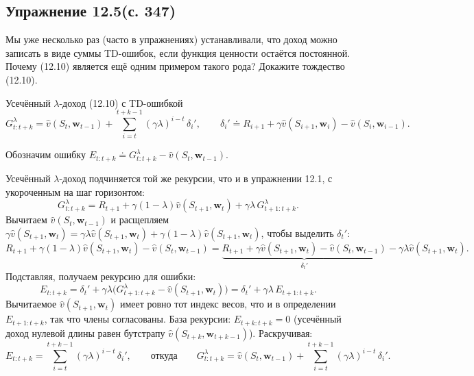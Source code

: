 \subsection{Упражнение 12.5(с. 347)}
Мы уже несколько раз (часто в упражнениях) устанавливали, что доход можно
записать в виде суммы TD-ошибок, если функция ценности остаётся постоянной.
Почему (12.10) является ещё одним примером такого рода? Докажите тождество
(12.10).

Усечённый $\lambda$-доход (12.10) с TD-ошибкой
\begin{equation}
    G_{t:t+k}^\lambda = \hat v(S_t,\mathbf w_{t-1})
    + \sum_{i=t}^{t+k-1} (\gamma\lambda)^{i-t}\,\delta_i',
    \qquad
    \delta_i' \doteq R_{i+1} + \gamma\hat v(S_{i+1},\mathbf w_i) - \hat v(S_i,\mathbf w_{i-1}).
    \tag{12.10}
\end{equation}

\begin{solution}
    Обозначим ошибку $E_{t:t+k}\doteq G_{t:t+k}^\lambda - \hat v(S_t,\mathbf w_{t-1})$.

    Усечённый $\lambda$-доход подчиняется той же рекурсии, что и в упражнении 12.1,
    с укороченным на шаг горизонтом:
    \begin{equation*}
        G_{t:t+k}^\lambda = R_{t+1} + \gamma(1-\lambda)\hat v(S_{t+1},\mathbf w_t)
        + \gamma\lambda\,G_{t+1:t+k}^\lambda.
    \end{equation*}
    Вычитаем $\hat v(S_t,\mathbf w_{t-1})$ и расщепляем $\gamma\hat v(S_{t+1},\mathbf w_t)
    = \gamma\lambda\hat v(S_{t+1},\mathbf w_t) + \gamma(1-\lambda)\hat v(S_{t+1},\mathbf w_t)$,
    чтобы выделить $\delta_t'$:
    \begin{equation*}
        R_{t+1} + \gamma(1-\lambda)\hat v(S_{t+1},\mathbf w_t) - \hat v(S_t,\mathbf w_{t-1})
        = \underbrace{R_{t+1} + \gamma\hat v(S_{t+1},\mathbf w_t) - \hat v(S_t,\mathbf w_{t-1})}_{\delta_t'}
          - \gamma\lambda\hat v(S_{t+1},\mathbf w_t).
    \end{equation*}
    Подставляя, получаем рекурсию для ошибки:
    \begin{equation*}
        E_{t:t+k} = \delta_t' + \gamma\lambda\big(G_{t+1:t+k}^\lambda - \hat v(S_{t+1},\mathbf w_t)\big)
        = \delta_t' + \gamma\lambda\,E_{t+1:t+k}.
    \end{equation*}
    Вычитаемое $\hat v(S_{t+1},\mathbf w_t)$ имеет ровно тот индекс весов, что и в
    определении $E_{t+1:t+k}$, так что члены согласованы. База рекурсии:
    $E_{t+k:t+k}=0$ (усечённый доход нулевой длины равен бутстрапу $\hat
    v(S_{t+k},\mathbf w_{t+k-1})$). Раскручивая:
    \begin{equation*}
        E_{t:t+k} = \sum_{i=t}^{t+k-1} (\gamma\lambda)^{i-t}\,\delta_i',
        \qquad\text{откуда}\qquad
        G_{t:t+k}^\lambda = \hat v(S_t,\mathbf w_{t-1}) + \sum_{i=t}^{t+k-1} (\gamma\lambda)^{i-t}\,\delta_i'.
    \end{equation*}
\end{solution}

